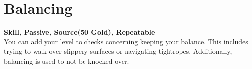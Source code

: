 \section{Balancing}\label{sec:balancing}
\textbf{Skill, Passive, Source(50 Gold), Repeatable}\\
You can add your level to checks concerning keeping your balance.
This includes trying to walk over slippery surfaces or navigating tightropes.
Additionally, balancing is used to not be knocked over.